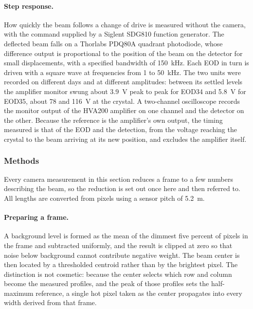 \documentclass{article}
\begin{document}
\paragraph{Step response.}
How quickly the beam follows a change of drive is measured without the camera, with the command
supplied by a Siglent SDG810 function generator. The deflected beam
falls on a Thorlabs PDQ80A quadrant photodiode, whose difference output is proportional to the
position of the beam on the detector for small displacements, with a specified bandwidth of
150~kHz. Each EOD in turn is driven with a square wave at frequencies from 1 to 50~kHz. The two units were
recorded on different days and at different amplitudes: between its settled levels the amplifier
monitor swung about 3.9~V peak to peak for EOD34 and 5.8~V for EOD35, about 78 and 116~V at the
crystal. A
two-channel oscilloscope records the monitor output of the HVA200 amplifier on one channel and the detector on
the other. Because the reference is the amplifier's own output, the timing measured is that of
the EOD and the detection, from the voltage reaching the crystal to the beam arriving at its
new position, and excludes the amplifier itself.

\subsubsection{Methods}

Every camera measurement in this section reduces a frame to a few numbers describing the beam,
so the reduction is set out once here and then referred to. All lengths are converted from pixels
using a sensor pitch of 5.2~\textmu m.

\paragraph{Preparing a frame.}
A background level is formed as the mean of the dimmest five percent of pixels in the frame and
subtracted uniformly, and the result is clipped at zero so that noise below background cannot
contribute negative weight. The beam center is then located by a thresholded centroid rather than
by the brightest pixel. The distinction is not cosmetic: because the center selects which row and
column become the measured profiles, and the peak of those profiles sets the half-maximum
reference, a single hot pixel taken as the center propagates into every width derived from that
frame.
\end{document}
